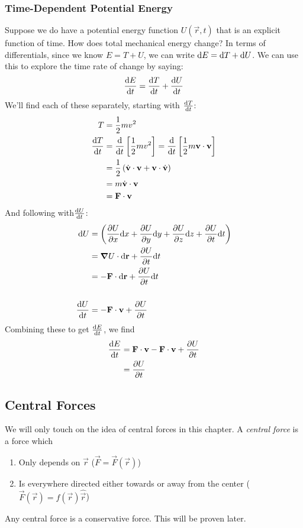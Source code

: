 \documentclass[a4paper]{article}
\begin{document}
\subsubsection{Time-Dependent Potential Energy}
Suppose we do have a potential energy function $U(\vec{r},t)$ that is an
explicit function of time. How does total mechanical energy change? In terms of
differentials, since we know $E = T + U$, we can write $\mathrm{d} E = \mathrm{d} T + \mathrm{d} U$.
We can use this to explore the time rate of change by saying:
\begin{align*}
    \frac{\mathrm{d} E}{\mathrm{d} t} &= \frac{\mathrm{d} T}{\mathrm{d} t} + \frac{\mathrm{d} U}{\mathrm{d} t}\\
\end{align*}
We'll find each of these separately, starting with $\frac{\mathrm{d} T}{\mathrm{d} t}$:
\begin{align*}
    T &= \frac{1}{2}mv^2\\
    \frac{\mathrm{d} T}{\mathrm{d} t} &= \frac{\mathrm{d}}{\mathrm{d} t}\left[\frac{1}{2}mv^2\right]
        = \frac{\mathrm{d}}{\mathrm{d} t}\left[\frac{1}{2}m\boldsymbol{\mathbf{v}}\cdot\boldsymbol{\mathbf{v}}\right]\\
    &= \frac{1}{2}\left(\dot{\boldsymbol{\mathbf{v}}}\cdot\boldsymbol{\mathbf{v}} +
        \boldsymbol{\mathbf{v}}\cdot\dot{\boldsymbol{\mathbf{v}}}\right)\\
    &= m\dot{\boldsymbol{\mathbf{v}}}\cdot\boldsymbol{\mathbf{v}}\\
    &= \boldsymbol{\mathbf{F}}\cdot\boldsymbol{\mathbf{v}}
\end{align*}
And following with$\frac{\mathrm{d} U}{\mathrm{d} t}$:
\begin{align*}
    \mathrm{d} U &= \left(\frac{\partial U}{\partial x}\mathrm{d} x + \frac{\partial U}{\partial y}\mathrm{d} y + \frac{\partial U}{\partial z}\mathrm{d} z +
        \frac{\partial U}{\partial t}\mathrm{d} t\right)\\
    &= \boldsymbol{\mathbf{\nabla}} U \cdot\mathrm{d}\boldsymbol{\mathbf{r}} + \frac{\partial U}{\partial t}\mathrm{d} t\\
    &= -\boldsymbol{\mathbf{F}}\cdot\mathrm{d}\boldsymbol{\mathbf{r}} + \frac{\partial U}{\partial t}\mathrm{d} t\\~\\
    \frac{\mathrm{d} U}{\mathrm{d} t} &= -\boldsymbol{\mathbf{F}}\cdot\boldsymbol{\mathbf{v}} + \frac{\partial U}{\partial t}
\end{align*}
Combining these to get $\frac{\mathrm{d} E}{\mathrm{d} t}$, we find
\begin{align*}
    \frac{\mathrm{d} E}{\mathrm{d} t} &= \boldsymbol{\mathbf{F}}\cdot\boldsymbol{\mathbf{v}}-\boldsymbol{\mathbf{F}}\cdot\boldsymbol{\mathbf{v}}+\frac{\partial U}{\partial t}\\
    &= \frac{\partial U}{\partial t}
\end{align*}

\subsection{Central Forces}
We will only touch on the idea of central forces in this chapter. A
\emph{central force} is a force which
\begin{enumerate}
    \item Only depends on $\vec{r}$ ($\vec{F} = \vec{F}(\vec{r})$)\\
    \item Is everywhere directed either towards or away from the center
    ($\vec{F}(\vec{r}) = f(\vec{r})\hat{\vec{r}}$)
\end{enumerate}
\begin{prop}
    Any central force is a conservative force. This will be proven later.
\end{prop}
\end{document}
